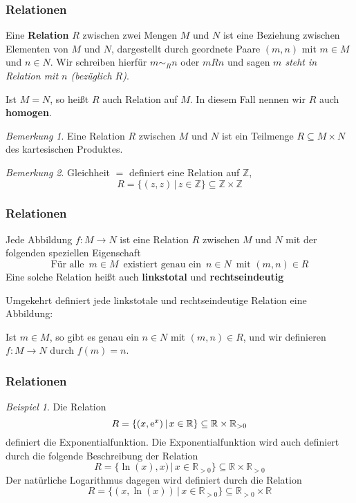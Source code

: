 \documentclass[hyperref={pdfpagelabels=false}]{beamer}
\theoremstyle{plain}%
\theoremstyle{definition}
\theoremstyle{remark}
\newtheorem*{beispiel}{Beispiel}
\newtheorem*{notiz}{Bemerkung}
\def \ee{{\relax\ifmmode \mathrm{e} \else e \fi}}
\def \R{\mathbb R}
\def \Z{\mathbb Z}
\begin{document}
\begin{frame}
\frametitle{Relationen}

\begin{definition} Eine \textbf{Relation} $R$ zwischen zwei Mengen $M$ und $N$ ist eine Beziehung
zwischen Elementen von $M$ und $N$, dargestellt durch geordnete Paare $(m,n)$ mit $m \in M$ und 
$n \in N$. Wir schreiben hierfür $m \sim_R n$ oder $mRn$ und sagen \textit{$m$ steht in Relation mit 
$n$ (bezüglich $R$)}.

Ist $M = N$, so heißt $R$ auch Relation auf $M$. In diesem Fall nennen wir $R$ auch \textbf{homogen}.
\end{definition}

\pause

\begin{notiz} Eine Relation $R$ zwischen $M$ und $N$ ist ein Teilmenge $R \subseteq M \times N$ des kartesischen 
Produktes.
\end{notiz}

\pause 

\begin{notiz}
Gleichheit $=$ definiert eine Relation auf $\Z$, 
	$$ R = \{(z,z) \, \vert \, z \in \Z \} \subseteq \Z \times \Z $$
\end{notiz}

\end{frame}

\begin{frame}
\frametitle{Relationen}

Jede Abbildung $f: M \longrightarrow N$ ist eine Relation $R$ zwischen $M$ und $N$ mit der folgenden 
speziellen Eigenschaft 
	$$ \text{Für alle } \, m \in M \, \text{ existiert genau ein } \, n \in N \, \text{ mit } (m,n) \in R $$
\pause 
Eine solche Relation heißt auch \textbf{linkstotal} und \textbf{rechtseindeutig}

\pause 

\bigbreak

Umgekehrt definiert jede linkstotale und rechtseindeutige Relation eine Abbildung: 

Ist $m \in M$, so gibt es genau ein $n \in N$ mit $(m,n) \in R$, und wir definieren $f: M \longrightarrow N$ 
durch $f(m)  = n$.  

\end{frame}

\begin{frame}
\frametitle{Relationen}

\begin{beispiel}
Die Relation 
	$$ R = \{ (x, \ee^x) \, \vert \, x \in \R\} \subseteq \R \times \R_{>0} $$
definiert die Exponentialfunktion. \pause Die Exponentialfunktion wird auch definiert durch die 
folgende Beschreibung der Relation 
	$$ R = \{ \ln(x), x)\, \vert \, x \in \R_{>0}\} \subseteq \R \times \R_{>0} $$
\pause 
Der natürliche Logarithmus dagegen wird definiert durch die Relation 
	$$ R = \{ (x, \ln(x)) \, \vert \, x \in \R_{>0} \} \subseteq \R_{> 0} \times \R $$
\end{beispiel}

\end{frame}
\end{document}
